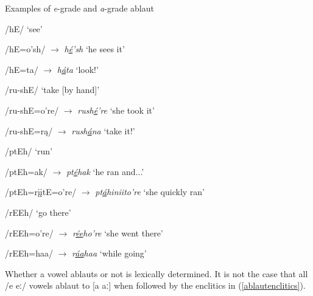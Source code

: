 \begin{exe}
\item\label{ablautexamples} Examples of \textit{e}-grade and \textit{a}-grade ablaut

\begin{xlist}
	\item\label{ablautexamples1} /hE/ `see'
		\begin{xlist}
		\item /hE=o'sh/ $\to$ \textit{h\uline{é}'sh} `he sees it'
		\item /hE=ta/ $\to$ \textit{h\uline{á}ta} `look!'
		\end{xlist}

	\item\label{ablautexamples2} /ru-shE/ `take [by hand]'
		\begin{xlist}
		\item /ru-shE=o're/ $\to$ \textit{rush\uline{é}'re} `she took it'
		\item /ru-shE=rą/ $\to$ \textit{rush\uline{á}na} `take it!'
		\end{xlist}

	\item\label{ablautexamples3} /ptEh/ `run'
		\begin{xlist}
		\item /ptEh=ak/ $\to$ \textit{pt\uline{é}hak} `he ran and...'
		\item /ptEh=rįįtE=o're/	$\to$	 \textit{pt\uline{á}hiniito're} `she quickly ran'
		\end{xlist}

	\item\label{ablautexamples4} /rEEh/ `go there'
		\begin{xlist}
		\item /rEEh=o're/ $\to$ \textit{r\uline{ée}ho're} `she went there'

		\item /rEEh=haa/	$\to$ \textit{r\uline{áa}haa} `while going'
		\end{xlist}

\end{xlist}

\end{exe}

Whether a vowel ablauts or not is lexically determined. It is not the case that all /e eː/ vowels ablaut to [a aː] when followed by the enclitics in (\ref{ablautenclitics}).

